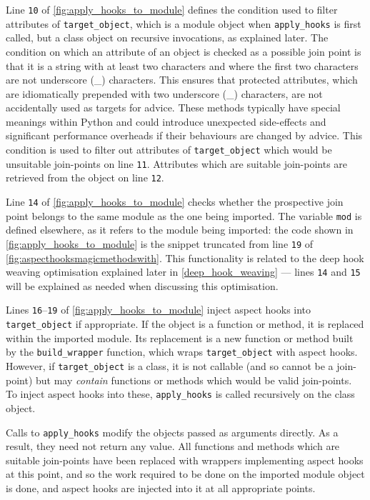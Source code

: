Line \texttt{10} of \cref{fig:apply_hooks_to_module} defines the condition used
to filter attributes of \lstinline{target_object}, which is a module object when
\lstinline{apply_hooks} is first called, but a class object on recursive
invocations, as explained later. The condition on which an attribute of an
object is checked as a possible join point is that it is a string with at least
two characters and where the first two characters are not underscore (\_)
characters. This ensures that protected attributes, which are idiomatically
prepended with two underscore (\_) characters, are not accidentally used as
targets for advice. These methods typically have special meanings within Python
and could introduce unexpected side-effects and significant performance
overheads if their behaviours are changed by advice. This condition is used to
filter out attributes of \lstinline{target_object} which would be unsuitable
join-points on line \texttt{11}. Attributes which are suitable join-points are
retrieved from the object on line \texttt{12}.

Line \texttt{14} of \cref{fig:apply_hooks_to_module} checks whether the
prospective join point belongs to the same module as the one being imported. The
variable \lstinline{mod} is defined elsewhere, as it refers to the module being
imported: the code shown in \cref{fig:apply_hooks_to_module} is the snippet
truncated from line \texttt{19} of \cref{fig:aspecthooksmagicmethodswith}. This
functionality is related to the deep hook weaving optimisation explained later
in \cref{deep_hook_weaving} --- lines \texttt{14} and \texttt{15} will be
explained as needed when discussing this optimisation.

Lines \texttt{16}--\texttt{19} of \cref{fig:apply_hooks_to_module} inject aspect
hooks into \lstinline{target_object} if appropriate. If the object is a function
or method, it is replaced within the imported module. Its replacement is a
new function or method built by the \lstinline{build_wrapper} function, which wraps
\lstinline{target_object} with aspect hooks. However, if
\lstinline{target_object} is a class, it is not callable (and so cannot be a
join-point) but may \emph{contain} functions or methods which would be valid
join-points. To inject aspect hooks into these, \lstinline{apply_hooks} is
called recursively on the class object.

Calls to \lstinline{apply_hooks} modify the objects passed as arguments
directly. As a result, they need not return any value. All functions
and methods which are suitable join-points have been replaced with wrappers
implementing aspect hooks at this point, and so the work required to be done on
the imported module object is done, and aspect hooks are injected into it at all
appropriate points.


